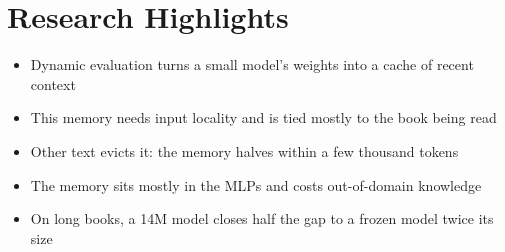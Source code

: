 \documentclass[11pt]{article}
\begin{document}
\section*{Research Highlights}

\begin{itemize}
\item Dynamic evaluation turns a small model's weights into a cache of recent context
\item This memory needs input locality and is tied mostly to the book being read
\item Other text evicts it: the memory halves within a few thousand tokens
\item The memory sits mostly in the MLPs and costs out-of-domain knowledge
\item On long books, a 14M model closes half the gap to a frozen model twice its size
\end{itemize}
\end{document}
